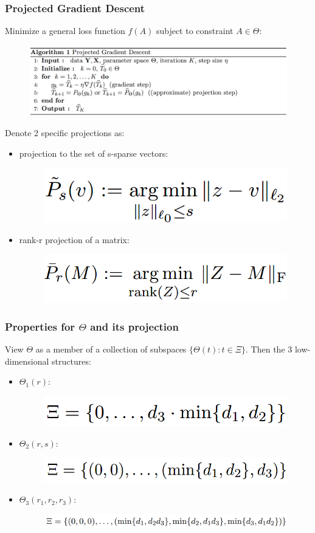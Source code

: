 \documentclass{beamer}
\begin{document}
	
	\begin{frame}
		\frametitle{Projected Gradient Descent}
		Minimize a general loss function $f(A)$ subject to constraint $A\in \Theta$:
		\begin{figure}
			\includegraphics[width=.9\linewidth]{image007.png}
		\end{figure}
		Denote 2 specific projections as:
		\begin{itemize}
			\item 
			projection to the set of s-sparse vectors:
			\begin{figure}
				\includegraphics[width=.4\linewidth]{image008.png}
			\end{figure}
			\item
			rank-r projection of a matrix:
			\begin{figure}
				\includegraphics[width=.4\linewidth]{image009.png}
			\end{figure}
		\end{itemize}
	\end{frame}
	
	\begin{frame}
		\frametitle{Properties for $\Theta$ and its projection}
		View $\Theta$ as a member of a collection of subspaces $\{\Theta(t): t\in \Xi\}$. Then the 3 low-dimensional structures:
		\begin{itemize}
			\item 
			$\Theta_1(r):$
			\begin{figure}
				\includegraphics[width=.35\linewidth]{image010.png}
			\end{figure}
			\item
			$\Theta_2(r, s):$
			\begin{figure}
				\includegraphics[width=.4\linewidth]{image011.png}
			\end{figure}
			\item
			$\Theta_3(r_1, r_2, r_3):$
			\begin{figure}
				\includegraphics[width=.8\linewidth]{image012.png}
			\end{figure}
		\end{itemize}
	\end{frame}
	
\end{document}
